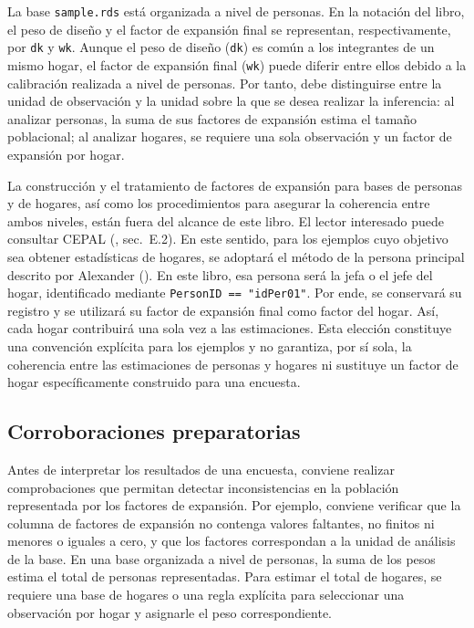 \documentclass[
  spanish,
  11pt,
  letterpaper,
  oneside,
  open=any]{scrbook}
\begin{document}
La base \texttt{sample.rds} está organizada a nivel de personas. En la
notación del libro, el peso de diseño y el factor de expansión final se
representan, respectivamente, por \texttt{dk} y \texttt{wk}. Aunque el
peso de diseño (\texttt{dk}) es común a los integrantes de un mismo
hogar, el factor de expansión final (\texttt{wk}) puede diferir entre
ellos debido a la calibración realizada a nivel de personas. Por tanto,
debe distinguirse entre la unidad de observación y la unidad sobre la
que se desea realizar la inferencia: al analizar personas, la suma de
sus factores de expansión estima el tamaño poblacional; al analizar
hogares, se requiere una sola observación y un factor de expansión por
hogar.

La construcción y el tratamiento de factores de expansión para bases de
personas y de hogares, así como los procedimientos para asegurar la
coherencia entre ambos niveles, están fuera del alcance de este libro.
El lector interesado puede consultar CEPAL
(, sec.~E.2). En este sentido,
para los ejemplos cuyo objetivo sea obtener estadísticas de hogares, se
adoptará el método de la persona principal descrito por Alexander
(). En este libro, esa persona será la
jefa o el jefe del hogar, identificado mediante
\texttt{PersonID\ ==\ "idPer01"}. Por ende, se conservará su registro y
se utilizará su factor de expansión final como factor del hogar. Así,
cada hogar contribuirá una sola vez a las estimaciones. Esta elección
constituye una convención explícita para los ejemplos y no garantiza,
por sí sola, la coherencia entre las estimaciones de personas y hogares
ni sustituye un factor de hogar específicamente construido para una
encuesta.

\subsection{Corroboraciones
preparatorias}\label{corroboraciones-onconsistencias}

Antes de interpretar los resultados de una encuesta, conviene realizar
comprobaciones que permitan detectar inconsistencias en la población
representada por los factores de expansión. Por ejemplo, conviene
verificar que la columna de factores de expansión no contenga valores
faltantes, no finitos ni menores o iguales a cero, y que los factores
correspondan a la unidad de análisis de la base. En una base organizada
a nivel de personas, la suma de los pesos estima el total de personas
representadas. Para estimar el total de hogares, se requiere una base de
hogares o una regla explícita para seleccionar una observación por hogar
y asignarle el peso correspondiente.
\end{document}
